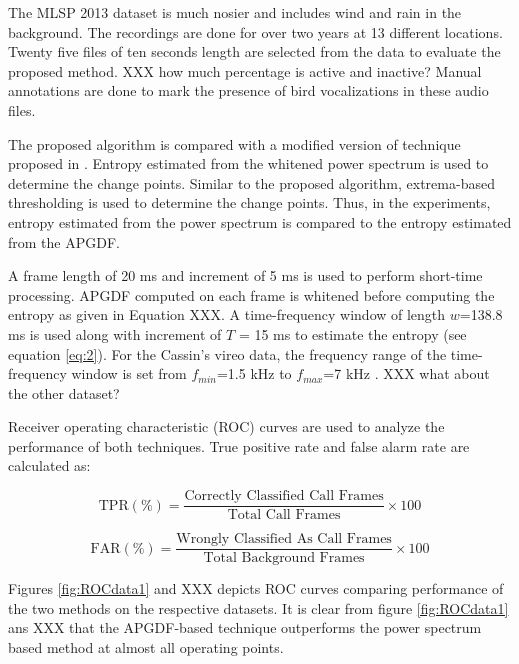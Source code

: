 \documentclass[a4paper]{article}
\begin{document}
The MLSP 2013 dataset \cite{data2} is much nosier and includes wind and rain in
the background. The recordings are done for over two years at 13 different
locations. Twenty five files of ten seconds length are selected from the data to
evaluate the proposed method. XXX how much percentage is active and inactive?
Manual annotations are done to mark the presence
of bird vocalizations in these audio files.  


The proposed algorithm is compared with a modified version of technique proposed
in \cite{wang2013}. Entropy estimated from the whitened power spectrum is used
to determine the change points. Similar to the proposed algorithm, extrema-based
thresholding is used to determine the change points. Thus, in the experiments,
entropy estimated from the power spectrum is compared to the entropy estimated
from the APGDF.
 
A frame length of 20 ms and increment of 5 ms is used to perform short-time
processing. APGDF computed on each frame is whitened before computing the
entropy as given in Equation XXX. A time-frequency window of length $w$=138.8 ms
is used along with increment of $T$ = 15 ms to estimate the entropy (see
equation \ref{eq:2}). For the Cassin's vireo data, the frequency range of the
time-frequency window is set from $f_{min}$=1.5 kHz to $f_{max}$=7 kHz
\cite{wang2013}. XXX what about the other dataset?

Receiver operating characteristic (ROC) curves are used to analyze the
performance of both techniques. True positive rate and false alarm rate are
calculated as:

\begin{equation}
\text{TPR} (\%)=\frac{\text{Correctly Classified Call Frames}} {\text{Total Call Frames}} \times 100 
\end{equation}

\begin{equation}
\text{FAR} (\%)=\frac{\text{Wrongly Classified As Call Frames}} {\text{Total Background Frames}} \times 100 
\end{equation}

Figures \ref{fig:ROCdata1} and XXX depicts ROC curves comparing performance of
the two methods on the respective datasets. It is clear from  figure
\ref{fig:ROCdata1} ans XXX that the APGDF-based technique outperforms the power
spectrum based method at almost all operating points.
\end{document}
